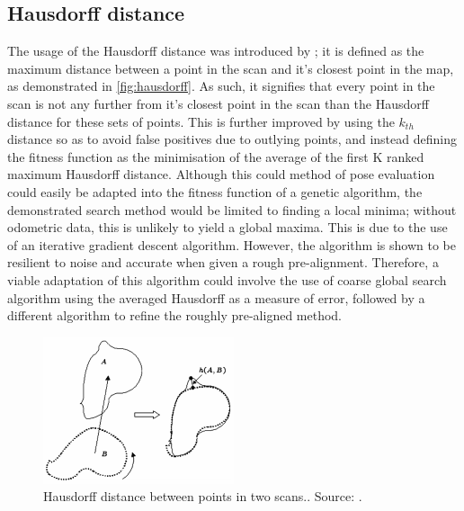 \documentclass[authoryearcitations]{UoYCSproject}
\begin{document}
\subsection{Hausdorff distance}
The usage of the Hausdorff distance was introduced by \citet{Donoso-Aguirre2008-pb}; it is defined as the maximum distance between a point in the scan and it's closest point in the map, as demonstrated in \autoref{fig:hausdorff}. As such, it signifies that every point in the scan is not any further from it's closest point in the scan than the Hausdorff distance for these sets of points. This is further improved by using the $k_{th}$ distance so as to avoid false positives due to outlying points, and instead defining the fitness function as the minimisation of the average of the first K ranked maximum Hausdorff distance. Although this could method of pose evaluation could easily be adapted into the fitness function of a genetic algorithm, the demonstrated search method would be limited to finding a local minima; without odometric data, this is unlikely to yield a global maxima. This is due to the use of an iterative gradient descent algorithm. However, the algorithm is shown to be resilient to noise and accurate when given a rough pre-alignment. Therefore, a viable adaptation of this algorithm could involve the use of coarse global search algorithm using the averaged Hausdorff as a measure of error, followed by a different algorithm to refine the roughly pre-aligned method.

\begin{figure}[t]
	\centering
	\includegraphics[width=0.5\textwidth,keepaspectratio]{images/hausdorff.png}

	\caption{Hausdorff distance between points in two scans.. Source: \citet{Donoso-Aguirre2008-pb}.}
	\label{fig:hausdorff}
\end{figure}
\end{document}
